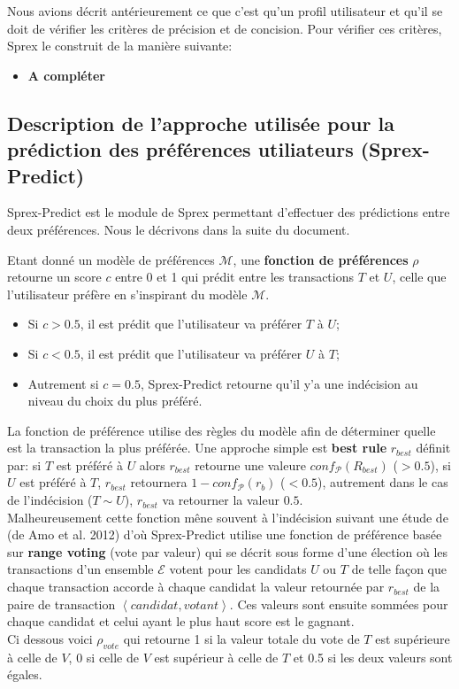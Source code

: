 \documentclass[a4paper,12pt,openany,oneside]{article}
\begin{document}
Nous avions décrit antérieurement ce que c'est qu'un profil utilisateur et qu'il se doit de vérifier les critères de précision et de concision. Pour vérifier ces critères, Sprex le construit de la manière suivante:
\begin{itemize}
\item \textbf{A compléter}
\end{itemize}






\subsection{Description de l'approche utilisée pour la prédiction des préférences utiliateurs (Sprex-Predict)}

Sprex-Predict est le module de Sprex permettant d'effectuer des prédictions entre deux préférences. Nous le décrivons dans la suite du document.

Etant donné un modèle de préférences $\mathcal{M}$, une \textbf{fonction de préférences} $\rho$ retourne un score $c$ entre 0 et 1 qui prédit entre les transactions $T$ et $U$, celle que l'utilisateur préfère en s'inspirant du modèle $\mathcal{M}$.
\begin{itemize}
\item Si $c>0.5$, il est prédit que l'utilisateur va préférer $T$ à $U$;
\item Si $c<0.5$, il est prédit que l'utilisateur va préférer $U$ à $T$;
\item Autrement si $c=0.5$, Sprex-Predict retourne qu'il y'a une indécision au niveau du choix du plus préféré.
\end{itemize}

La fonction de préférence utilise des règles du modèle afin de déterminer quelle est la transaction la plus préférée. 
Une approche simple est \textbf{best rule} $r_{best}$ définit par: si $T$ est préféré à $U$ alors $r_{best}$ retourne une valeure $conf_\mathcal{P}(R_{best})$ ($>0.5$), si $U$ est préféré à $T$, $r_{best}$ retournera $1-conf_\mathcal{P}(r_b)$ ($<0.5$), autrement dans le cas de l'indécision ($T\sim U$), $r_{best}$ va retourner la valeur $0.5$.\\
Malheureusement cette fonction mêne souvent à l'indécision suivant une étude de (de Amo et al. 2012) d'où Sprex-Predict utilise une fonction de préférence basée sur \textbf{range voting} (vote par valeur) qui se décrit sous forme d'une élection où les transactions d'un ensemble $\mathcal{E}$ votent pour les candidats $U$ ou $T$ de telle façon que chaque transaction accorde à chaque candidat la valeur retournée par $r_{best}$ de la paire de transaction $\left<candidat,votant\right>$. Ces valeurs sont ensuite sommées pour chaque candidat et celui ayant le plus haut score est le gagnant. \\
Ci dessous voici $\rho_{vote}$ qui retourne 1 si la valeur totale du vote de $T$ est supérieure à celle de $V$, 0 si celle de  $V$ est supérieur à celle de $T$ et 0.5 si les deux valeurs sont égales.
\end{document}
